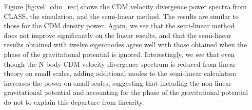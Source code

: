 \documentclass{aastex}
\begin{document}
Figure \ref{fig:vel_cdm_rec} shows the CDM
velocity divergence power spectra from CLASS, the simulation,
and the semi-linear method.  The results are similar to those for the
CDM density power.   Again, we see that
the semi-linear method does not improve significantly on the linear
results, and that the semi-linear results obtained with twelve eigenmodes
agree well with those obtained when the phase of the
gravitational potential is ignored. Interestingly, we see that even
though the N-body CDM velocity divergence spectrum is reduced
from linear theory on small scales, adding additional modes to the
semi-linear calculation increases the power on small scales, suggesting that
including 
the non-linear gravitational potential and accounting for the phase of
the gravitational potential do not to explain this departure
from linearity.
\end{document}
